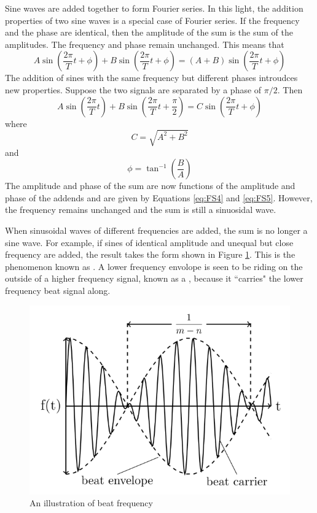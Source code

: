 \documentclass[12pt, a4paper, oneside, openright, titlepage]{book}
\begin{document}
\noindent Sine waves are added together to form Fourier series. In this light, the addition properties of two sine waves is a special case of Fourier series. If the frequency and the phase are identical, then the amplitude of the sum is the sum of the amplitudes. The frequency and phase remain unchanged. This means that \begin{equation}\label{eq:FS2}
    A\sin\left(\frac{2\pi}{T}t+\phi\right) + B\sin\left(\frac{2\pi}{T}t+\phi\right) = (A+B)\sin\left(\frac{2\pi}{T}t+\phi\right)
\end{equation}
The addition of sines with the same frequency but different phases introudces new properties. Suppose the two signals are separated by a phase of $\pi/2$. Then \begin{equation}\label{eq:FS3}
    A\sin\left(\frac{2\pi}{T}t\right) + B\sin\left(\frac{2\pi}{T}t+\frac{\pi}{2}\right) = C\sin\left(\frac{2\pi}{T}t+\phi\right)
\end{equation}
where \begin{equation}\label{eq:FS4}
    C = \sqrt{A^2+B^2}
\end{equation}
and \begin{equation}\label{eq:FS5}
    \phi = \tan^{-1}\left(\frac{B}{A}\right)
\end{equation}
The amplitude and phase of the sum are now functions of the amplitude and phase of the addends and are given by Equations \ref{eq:FS4} and \ref{eq:FS5}. However, the frequency remains unchanged and the sum is still a sinuosidal wave.

\noindent When sinusoidal waves of different frequencies are added, the sum is no longer a sine wave. For example, if sines of identical amplitude and unequal but close frequency are added, the result takes the form shown in Figure \ref{fig:FS3}. This is the phenomenon known as . A lower frequency envolope is seen to be riding on the outside of a higher frequency signal, known as a , because it ``carries" the lower frequency beat signal along.

\begin{figure}[H]
    \centering
    \includegraphics[scale = 0.8]{Images/FS3.PNG}
    \caption{An illustration of beat frequency}
    \label{fig:FS3}
\end{figure}
\end{document}
